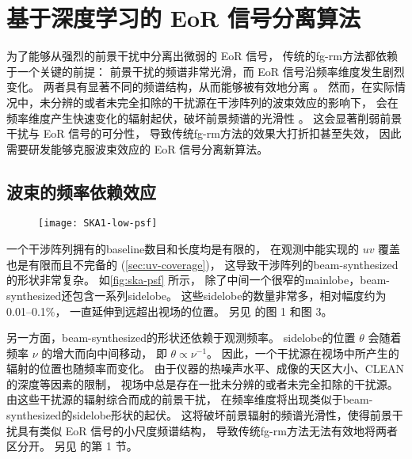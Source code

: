 
\chapter{基于深度学习的 EoR 信号分离算法}
\label{chap:cdae}

为了能够从强烈的前景干扰中分离出微弱的 EoR 信号，
传统的\ac{fg-rm}方法都依赖于一个关键的前提：
前景干扰的频谱非常光滑，而 EoR 信号沿频率维度发生剧烈变化。
两者具有显著不同的频谱结构，从而能够被有效地分离 \cite{morales2010,chapman2016}。
然而，在实际情况中，未分辨的或者未完全扣除的干扰源在干涉阵列的波束效应的影响下，
会在频率维度产生快速变化的辐射起伏，破坏前景频谱的光滑性 \cite{liu2009ps}。
这会显著削弱前景干扰与 EoR 信号的可分性，
导致传统\ac{fg-rm}方法的效果大打折扣甚至失效，
因此需要研发能够克服波束效应的 EoR 信号分离新算法。


\section{波束的频率依赖效应}
\label{sec:beam-effect}

\begin{figure}[htp]
  \centering
  \texttt{[image: SKA1-low-psf]}
  \label{fig:ska-psf}
\end{figure}

一个干涉阵列拥有的\ac{baseline}数目和长度均是有限的，
在观测中能实现的 $uv$ 覆盖也是有限而且不完备的 (\autoref{sec:uv-coverage})，
这导致干涉阵列的\ac{beam-synthesized}的形状非常复杂。
如\autoref{fig:ska-psf} 所示，
除了中间一个很窄的\ac{mainlobe}，\ac{beam-synthesized}还包含一系列\ac{sidelobe}。
这些\ac{sidelobe}的数量非常多，相对幅度约为 \numrange{0.01}{0.1}\%，
一直延伸到远超出视场的位置。
另见  的图 1 和图 3。

另一方面，\ac{beam-synthesized}的形状还依赖于观测频率。
\ac{sidelobe}的位置 $\theta$ 会随着频率 $\nu$ 的增大而向中间移动，
即 $\theta \propto \nu^{-1}$。
因此，一个干扰源在视场中所产生的辐射的位置也随频率而变化。
由于仪器的热噪声水平、成像的天区大小、CLEAN 的深度等因素的限制，
视场中总是存在一批未分辨的或者未完全扣除的干扰源。
由这些干扰源的辐射综合而成的前景干扰，
在频率维度将出现类似于\ac{beam-synthesized}的\ac{sidelobe}形状的起伏。
这将破坏前景辐射的频谱光滑性，使得前景干扰具有类似 EoR 信号的小尺度频谱结构，
导致传统\ac{fg-rm}方法无法有效地将两者区分开。
另见  的第 1 节。


